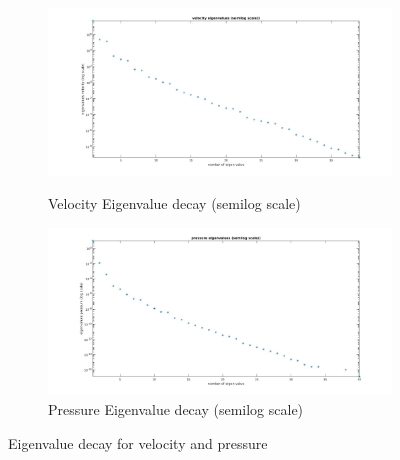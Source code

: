 \documentclass[a4paper,oneside,openright,spanish,english]{book}
\begin{document}
\begin{figure}
\begin{subfigure}{\textwidth}	
  \includegraphics[width=\linewidth]{velocity_eigen_value_semilog.jpg}
  \caption{Velocity Eigenvalue decay (semilog scale)} 
  \label{eigen_value_decay_velocity_semilog}
  \includegraphics[width=\linewidth]{pressure_eigen_value_semilog.jpg}
  \caption{Pressure Eigenvalue decay (semilog scale)} 
  \label{eigen_value_decay_pressure_semilog}
\end{subfigure}
\caption{Eigenvalue decay for velocity and pressure}
\label{pod_eigenvalue_figure_semilog}
\end{figure}
\end{document}
